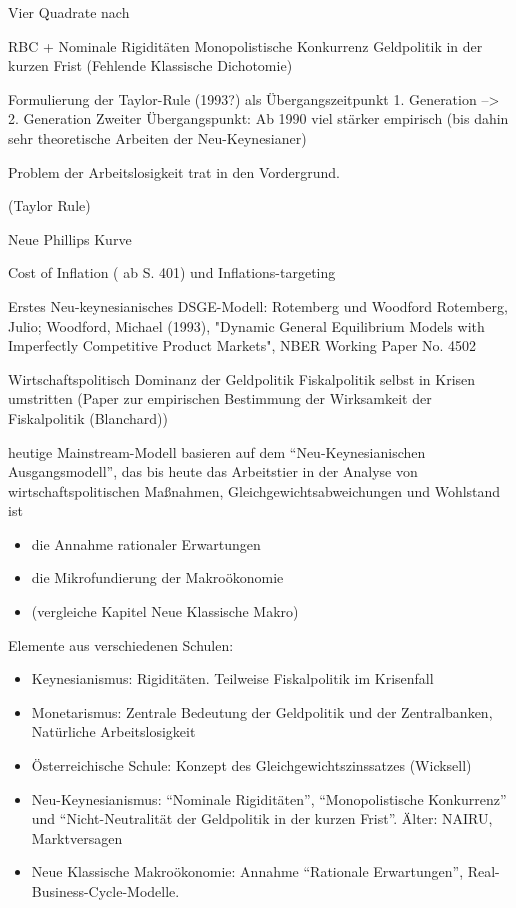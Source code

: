 Vier Quadrate nach \textcite{RomerDavid1993}




RBC + \textcite{RomerDavid1990}
Nominale Rigiditäten
Monopolistische Konkurrenz
Geldpolitik in der kurzen Frist (Fehlende Klassische Dichotomie)

Formulierung der Taylor-Rule (1993?) als  Übergangszeitpunkt 1. Generation --> 2. Generation
Zweiter Übergangspunkt: Ab 1990 viel stärker empirisch (bis dahin sehr theoretische Arbeiten der Neu-Keynesianer)

Problem der Arbeitslosigkeit trat in den Vordergrund.


(Taylor Rule)

Neue Phillips Kurve

Cost of Inflation (\textcite{Snowdon2005} ab S. 401) und Inflations-targeting

Erstes Neu-keynesianisches DSGE-Modell: Rotemberg und Woodford
Rotemberg, Julio; Woodford, Michael (1993), "Dynamic General Equilibrium Models with Imperfectly Competitive Product Markets", NBER Working Paper No. 4502

Wirtschaftspolitisch Dominanz der Geldpolitik
Fiskalpolitik selbst in Krisen umstritten (Paper zur empirischen Bestimmung der Wirksamkeit der Fiskalpolitik (Blanchard))






heutige Mainstream-Modell basieren auf dem "`Neu-Keynesianischen Ausgangsmodell"', das bis heute das Arbeitstier in der Analyse von wirtschaftspolitischen Maßnahmen, Gleichgewichtsabweichungen und Wohlstand ist \parencite[S. 52]{Gali2015}









\begin{itemize}
	\item die Annahme rationaler Erwartungen
	\item die Mikrofundierung der Makroökonomie
	\item (vergleiche Kapitel Neue Klassische Makro)
\end{itemize}


Elemente aus verschiedenen Schulen:
\begin{itemize}
	\item Keynesianismus: Rigiditäten. Teilweise Fiskalpolitik im Krisenfall
	\item Monetarismus: Zentrale Bedeutung der Geldpolitik und der Zentralbanken, Natürliche Arbeitslosigkeit
	\item Österreichische Schule: Konzept des Gleichgewichtszinssatzes (Wicksell)
	\item Neu-Keynesianismus: "`Nominale Rigiditäten"', "`Monopolistische Konkurrenz"' und "`Nicht-Neutralität der Geldpolitik in der kurzen Frist"'. Älter: NAIRU, Marktversagen
	\item Neue Klassische Makroökonomie: Annahme "`Rationale Erwartungen"', Real-Business-Cycle-Modelle.
\end{itemize}





